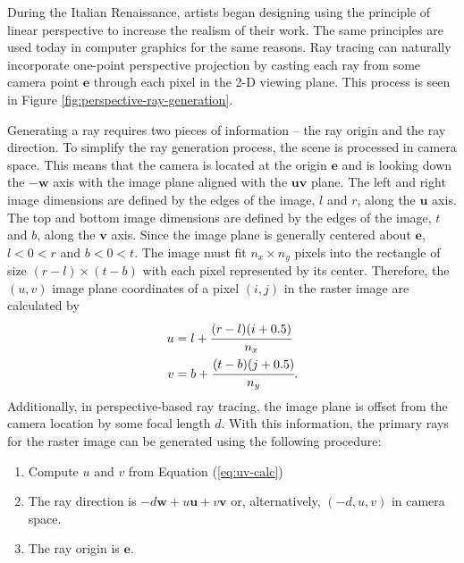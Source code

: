 \documentclass[letterpaper, 11pt, onecolumn, oneside]{article}
\begin{document}
        During the Italian Renaissance, artists began designing using the principle of linear perspective to increase the realism of their work.
        The same principles are used today in computer graphics for the same reasons.
        Ray tracing can naturally incorporate one-point perspective projection by casting each ray from some camera point $\boldsymbol{e}$ through each pixel in the 2-D viewing plane.
        This process is seen in Figure \ref{fig:perspective-ray-generation}.

        Generating a ray requires two pieces of information -- the ray origin and the ray direction.
        To simplify the ray generation process, the scene is processed in camera space.
        This means that the camera is located at the origin $\boldsymbol{e}$ and is looking down the $-\boldsymbol{w}$ axis with the image plane aligned with the $\boldsymbol{uv}$ plane.
        The left and right image dimensions are defined by the edges of the image, $l$ and $r$, along the $\boldsymbol{u}$ axis.
        The top and bottom image dimensions are defined by the edges of the image, $t$ and $b$, along the $\boldsymbol{v}$ axis.
        Since the image plane is generally centered about $\boldsymbol{e}$, $l < 0 < r$ and $b < 0 < t$.
        The image must fit $n_x \times n_y$ pixels into the rectangle of size $(r-l) \times (t-b)$ with each pixel represented by its center.
        Therefore, the $(u,v)$ image plane coordinates of a pixel $(i,j)$ in the raster image are calculated by
        \begin{align} \label{eq:uv-calc}
            \begin{split}
                u &= l + \cfrac{(r-l)(i + 0.5)}{n_x} \\
                v &= b + \cfrac{(t-b)(j + 0.5)}{n_y}.
            \end{split}
        \end{align}
        Additionally, in perspective-based ray tracing, the image plane is offset from the camera location by some focal length $d$.
        With this information, the primary rays for the raster image can be generated using the following procedure:
        \begin{enumerate}
            \item Compute $u$ and $v$ from Equation (\ref{eq:uv-calc})
            \item The ray direction is $-d\boldsymbol{w} + u\boldsymbol{u} + v\boldsymbol{v}$ or, alternatively, $(-d,u,v)$ in camera space.
            \item The ray origin is $\boldsymbol{e}$.
        \end{enumerate}
\end{document}
